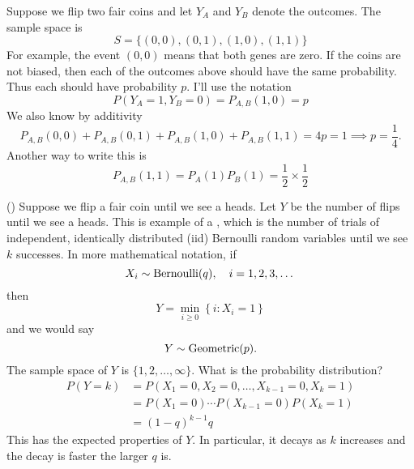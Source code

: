 \begin{itemize}
\begin{example}\label{ex:twocoins} Suppose we flip two fair coins and let $Y_A$ and $Y_B$ denote the outcomes.%
  The sample space is 
\begin{equation*}
S = \{(0,0),(0,1),(1,0),(1,1)\}
\end{equation*}
For example, the event $(0,0)$ means that both genes are zero.  If the coins are not biased, then each of the outcomes above should have the same probability. Thus each should have probability $p$. I'll use the notation 
\begin{equation*}
P(Y_A = 1,Y_B = 0) = P_{A,B}(1,0) = p
\end{equation*}
We also know by additivity 
\begin{equation*}
P_{A,B}(0,0) + P_{A,B}(0,1)+ P_{A,B}(1,0) + P_{A,B}(1,1) = 4p = 1 \implies p = \frac{1}{4}. 
\end{equation*}
Another way to write this is 
\begin{equation*}
P_{A,B}(1,1) = P_A(1)P_B(1)  = \frac{1}{2} \times \frac{1}{2}
\end{equation*}
\end{example}




\begin{example}(\cite[Example 2.3.4]{tabak})
Suppose we flip a fair coin until we see a heads. Let $Y$ be the number of flips until we see a heads. This is example of a  , which is the number of trials of independent, identically distributed (iid) Bernoulli random variables until we see $k$ successes. In more mathematical notation, if
\begin{equation*}
X_i \sim {\rm Bernoulli}(q), \quad i = 1,2,3,\dots
\end{equation*}
then 
\begin{equation*}
Y = \min_{i\ge0}\left\{i:X_i=1 \right\}
\end{equation*} 
and we would say 
\begin{equation*}
Y \sim {\rm Geometric}(p).
\end{equation*}
The sample space of $Y$ is $\{1,2,\dots,\infty\}$. What is the probability distribution? 
\begin{align*}
P(Y=k) &= P(X_1=0,X_2=0,\dots,X_{k-1}=0,X_k=1) \\
&= P(X_1 = 0) \cdots  P(X_{k-1}=0)P(X_k=1) \\
&= (1-q)^{k-1}q
\end{align*}
This has the expected properties of $Y$. In particular, it decays as $k$ increases and the decay is faster the larger $q$ is. 


\end{example}
\end{itemize}
